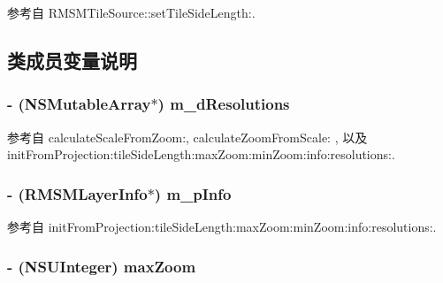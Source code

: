 参考自 R\-M\-S\-M\-Tile\-Source\-::set\-Tile\-Side\-Length\-:.



\subsection{类成员变量说明}
\hypertarget{interface_r_m_s_m_tile_projection_a3010dfce00c774103e1e13008cedfae9}{
\subsubsection[{m\-\_\-d\-Resolutions}]{\setlength{\rightskip}{0pt plus 5cm}-\/ (N\-S\-Mutable\-Array$\ast$) m\-\_\-d\-Resolutions\hspace{0.3cm}{\ttfamily [protected]}}}\label{interface_r_m_s_m_tile_projection_a3010dfce00c774103e1e13008cedfae9}


参考自 calculate\-Scale\-From\-Zoom\-:, calculate\-Zoom\-From\-Scale\-: , 以及 init\-From\-Projection\-:tile\-Side\-Length\-:max\-Zoom\-:min\-Zoom\-:info\-:resolutions\-:.

\hypertarget{interface_r_m_s_m_tile_projection_a9f1a037cccec0d7e4de974b541bce0ee}{
\subsubsection[{m\-\_\-p\-Info}]{\setlength{\rightskip}{0pt plus 5cm}-\/ ({\bf R\-M\-S\-M\-Layer\-Info}$\ast$) m\-\_\-p\-Info\hspace{0.3cm}{\ttfamily [protected]}}}\label{interface_r_m_s_m_tile_projection_a9f1a037cccec0d7e4de974b541bce0ee}


参考自 init\-From\-Projection\-:tile\-Side\-Length\-:max\-Zoom\-:min\-Zoom\-:info\-:resolutions\-:.

\hypertarget{interface_r_m_s_m_tile_projection_ad7bfc790b1fbb0f87c9dd3708bba7ca7}{
\subsubsection[{max\-Zoom}]{\setlength{\rightskip}{0pt plus 5cm}-\/ (N\-S\-U\-Integer) max\-Zoom\hspace{0.3cm}{\ttfamily [protected]}}}\label{interface_r_m_s_m_tile_projection_ad7bfc790b1fbb0f87c9dd3708bba7ca7}


